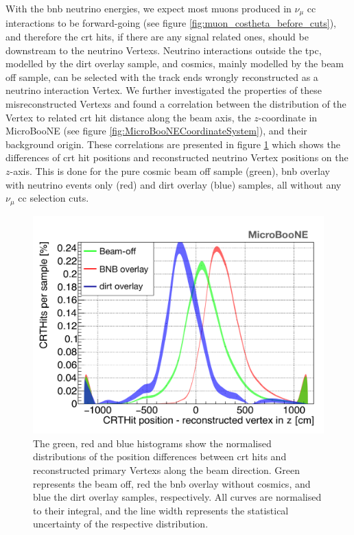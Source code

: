With the \gls{bnb} neutrino energies, we expect most muons produced in $\nu_{\mu}$ \gls{cc} interactions to be forward-going (see figure \ref{fig:muon_costheta_before_cuts}), and therefore the \gls{crt} hits, if there are any signal related ones, should be downstream to the neutrino \glspl{Vertex}. Neutrino interactions outside the \gls{tpc}, modelled by the dirt overlay sample, and cosmics, mainly modelled by the beam off sample, can be selected with the track ends wrongly reconstructed as a neutrino interaction \gls{Vertex}. We further investigated the properties of these misreconstructed \glspl{Vertex} and found a correlation between the distribution of the \gls{Vertex} to related \gls{crt} hit distance along the beam axis, \ie the $z$-coordinate in MicroBooNE (see figure \ref{fig:MicroBooNECoordinateSystem}), and their background origin. These correlations are presented in figure \ref{fig:posZ_CRT_cut2} which shows the differences of \gls{crt} hit positions and reconstructed neutrino \gls{Vertex} positions on the $z$-axis. This is done for the pure cosmic beam off sample (green), \gls{bnb} overlay with neutrino events only (red) and dirt overlay (blue) samples, all without any $\nu_{\mu}$ \gls{cc} selection cuts. 
\begin{figure}[htbp]
  \centering
  \includegraphics[width=0.7\linewidth]{images/NewCCInclusive/selection/posZ_CRT_vertex.pdf}
  \caption[Vertex to CRT Hit Distance for Multiple MC Samples]{The green, red and blue histograms show the normalised distributions of the position differences between \gls{crt} hits and reconstructed primary \glspl{Vertex} along the beam direction. Green represents the beam off, red the \gls{bnb} overlay without cosmics, and blue the dirt overlay samples, respectively. All curves are normalised to their integral, and the line width represents the statistical uncertainty of the respective distribution.}
  \label{fig:posZ_CRT_cut2}
\end{figure}
